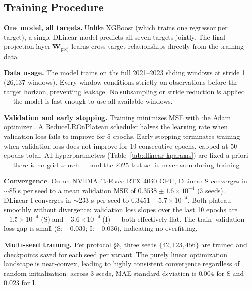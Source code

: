 \subsection{Training Procedure}

\textbf{One model, all targets.} Unlike XGBoost (which trains one regressor per
target), a single DLinear model predicts all seven targets jointly. The final
projection layer $\mathbf{W}_{\text{proj}}$ learns cross-target relationships
directly from the training data.

\textbf{Data usage.} The model trains on the full 2021--2023 sliding windows at
stride 1 (26,137 windows). Every window conditions strictly on observations
before the target horizon, preventing leakage. No subsampling or stride reduction
is applied --- the model is fast enough to use all available windows.

\textbf{Validation and early stopping.} Training minimizes MSE with the Adam
optimizer \citep{kingma2015adam}. A ReduceLROnPlateau scheduler halves the
learning rate when validation loss fails to improve for 5 epochs. Early stopping
terminates training when validation loss does not improve for 10 consecutive
epochs, capped at 50 epochs total. All hyperparameters
(Table~\ref{tab:dlinear-hparams}) are fixed a priori --- there is no grid search
--- and the 2025 test set is never seen during training.

\textbf{Convergence.} On an NVIDIA GeForce RTX 4060 GPU, DLinear-S converges in
$\sim$85 s per seed to a mean validation MSE of $0.3538 \pm 1.6\!\times\!10^{-4}$
(3 seeds). DLinear-I converges in $\sim$233 s per seed to
$0.3451 \pm 5.7\!\times\!10^{-4}$. Both plateau smoothly without divergence:
validation loss slopes over the last 10 epochs are $-1.5 \times 10^{-4}$ (S) and
$-3.6 \times 10^{-4}$ (I) --- both effectively flat. The train--validation loss
gap is small (S: $-0.030$; I: $-0.036$), indicating no overfitting.

\textbf{Multi-seed training.} Per protocol \S8, three seeds
$\{42, 123, 456\}$ are trained and checkpoints saved for each seed per variant.
The purely linear optimization landscape is near-convex, leading to highly
consistent convergence regardless of random initialization: across 3 seeds, MAE
standard deviation is $0.004$ for S and $0.023$ for I.


